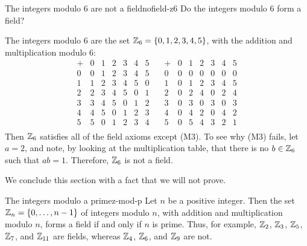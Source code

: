 \begin{example}{The integers modulo 6 are not a field}{nofield-z6}
  Do the integers modulo 6 form a field? 
\end{example}

\begin{solution}
  The integers modulo 6 are the set $\mathbb{Z}_6=\left\{0,1,2,3,4,5\right\}$, with the
  addition and multiplication modulo 6:
  \begin{equation*}
    \begin{array}{l|llllll}
      +&0&1&2&3&4&5 \\\hline
      0&0&1&2&3&4&5 \\
      1&1&2&3&4&5&0 \\
      2&2&3&4&5&0&1 \\
      3&3&4&5&0&1&2 \\
      4&4&5&0&1&2&3 \\
      5&5&0&1&2&3&4 \\
    \end{array}
    \quad
    \begin{array}{l|llllll}
      +&0&1&2&3&4&5 \\\hline
      0&0&0&0&0&0&0 \\
      1&0&1&2&3&4&5 \\
      2&0&2&4&0&2&4 \\
      3&0&3&0&3&0&3 \\
      4&0&4&2&0&4&2 \\
      5&0&5&4&3&2&1 \\
    \end{array}
  \end{equation*}
  Then $\mathbb{Z}_6$ satisfies all of the field axioms except
  (M3). To see why (M3) fails, let $a=2$, and note, by looking at the
  multiplication table, that there is no $b\in\mathbb{Z}_6$ such that
  $ab=1$. Therefore, $\mathbb{Z}_6$ is not a field.
\end{solution}

We conclude this section with a fact that we will not prove.

\begin{theorem}{The integers modulo a prime}{z-mod-p}
  Let $n$ be a positive integer. Then the set
  $\mathbb{Z}_n=\left\{0,\ldots,n-1\right\}$ of integers modulo $n$, with
  addition and multiplication modulo $n$, forms a field if and only if
  $n$ is prime. Thus, for example, $\mathbb{Z}_2$, $\mathbb{Z}_3$,
  $\mathbb{Z}_5$, $\mathbb{Z}_7$, and $\mathbb{Z}_{11}$ are fields,
  whereas $\mathbb{Z}_4$, $\mathbb{Z}_6$, and $\mathbb{Z}_9$ are not.
\end{theorem}
